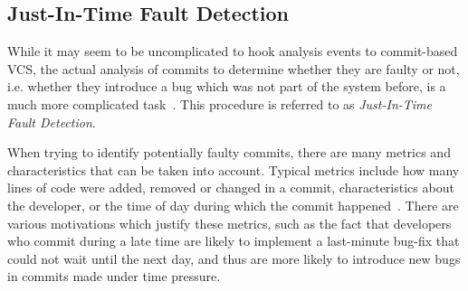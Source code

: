 \subsection{Just-In-Time Fault Detection}

While it may seem to be uncomplicated to hook analysis events to commit-based VCS, the actual analysis of commits to determine whether they are faulty or not, i.e. whether they introduce a bug which was not part of the system before, is a much more complicated task~\cite{Nayrolles2018, Kamei2013}. This procedure is referred to as \textit{Just-In-Time Fault Detection}.

When trying to identify potentially faulty commits, there are many metrics and characteristics that can be taken into account. Typical metrics include how many lines of code were added, removed or changed in a commit, characteristics about the developer, or the time of day during which the commit happened~\cite{Goyal2017}. There are various motivations which justify these metrics, such as the fact that developers who commit during a late time are likely to implement a last-minute bug-fix that could not wait until the next day, and thus are more likely to introduce new bugs in commits made under time pressure.


